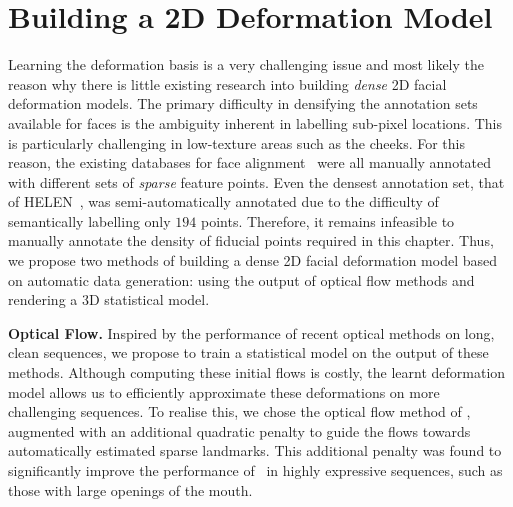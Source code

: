 \section{Building a 2D Deformation Model}\label{sec:face_flow_learning_deformation}
Learning the deformation basis is a very challenging issue and most likely the reason
why there is little existing research into building \textit{dense} 2D facial deformation models.
The primary difficulty in densifying the annotation sets available for faces
is the ambiguity inherent in labelling sub-pixel locations. This is particularly
challenging in low-texture areas such as the cheeks. For this reason, the 
existing databases for face alignment~\cite{sagonas2013300,zhu2012face,%
belhumeur2013localizing,le2012interactive} were all manually annotated with
different sets of \textit{sparse} feature points. 
Even the densest annotation set, that of HELEN~\cite{le2012interactive}, 
was semi-automatically annotated due to the difficulty of semantically
labelling only $194$ points. Therefore, it remains infeasible to manually
annotate the density of fiducial points required in this chapter. Thus, we
propose two methods of building a dense 2D facial deformation model based
on automatic data generation: using the output of optical flow methods and
rendering a 3D statistical model.

\textbf{Optical Flow.}
Inspired by the performance of recent optical methods on long, clean sequences,
we propose to train a statistical model on the output of these methods. 
Although computing these initial flows is costly, the learnt deformation model
allows us to efficiently approximate these deformations on more challenging
sequences. To realise this, we chose the optical flow method of
\citet{garg2013variational}, augmented with an additional quadratic penalty
to guide the flows towards automatically estimated sparse landmarks.
This additional penalty was found to significantly improve the performance
of~\cite{garg2013variational} in highly expressive sequences, such as those with 
large openings of the mouth.

